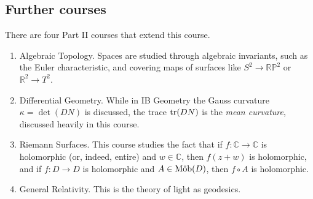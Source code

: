 \subsection{Further courses}
There are four Part II courses that extend this course.
\begin{enumerate}
	\item Algebraic Topology.
	      Spaces are studied through algebraic invariants, such as the Euler characteristic, and covering maps of surfaces like \( S^2 \to \mathbb R \mathbb P^2 \) or \( \mathbb R^2 \to T^2 \).
	\item Differential Geometry.
	      While in IB Geometry the Gauss curvature \( \kappa = \det (DN) \) is discussed, the trace \( \tr (DN) \) is the \textit{mean curvature}, discussed heavily in this course.
	\item Riemann Surfaces.
	      This course studies the fact that if \( f \colon \mathbb C \to \mathbb C \) is holomorphic (or, indeed, entire) and \( w \in \mathbb C \), then \( f(z+w) \) is holomorphic, and if \( f \colon D \to D \) is holomorphic and \( A \in \text{M\"ob}(D) \), then \( f \circ A \) is holomorphic.
	\item General Relativity.
	      This is the theory of light as geodesics.
\end{enumerate}
